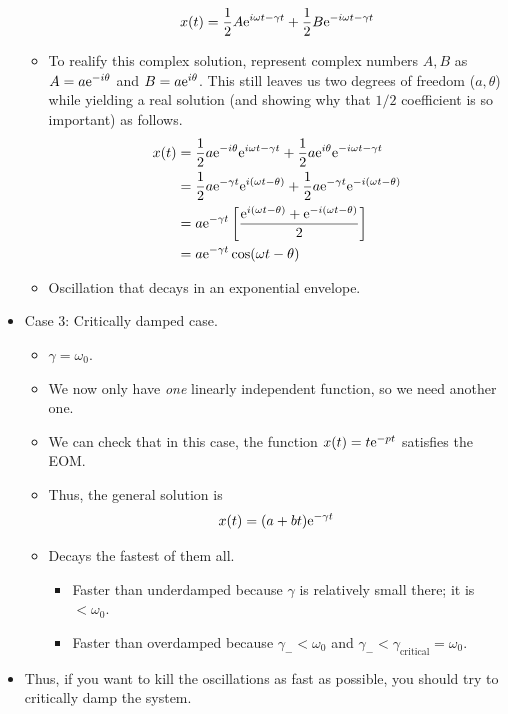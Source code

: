 \documentclass[../notes.tex]{subfiles}
\begin{document}
\begin{itemize}
\begin{itemize}
\begin{equation*}
            x(t) = \frac{1}{2}A\e[i\omega t-\gamma t]+\frac{1}{2}B\e[-i\omega t-\gamma t]
        \end{equation*}
        \item To realify this complex solution, represent complex numbers $A,B$ as $A=a\e[-i\theta]$ and $B=a\e[i\theta]$. This still leaves us two degrees of freedom ($a,\theta$) while yielding a real solution (and showing why that $1/2$ coefficient is so important) as follows.
        \begin{align*}
            x(t) &= \frac{1}{2}a\e[-i\theta]\e[i\omega t-\gamma t]+\frac{1}{2}a\e[i\theta]\e[-i\omega t-\gamma t]\\
            &= \frac{1}{2}a\e[-\gamma t]\e[i(\omega t-\theta)]+\frac{1}{2}a\e[-\gamma t]\e[-i(\omega t-\theta)]\\
            &= a\e[-\gamma t]\left[ \frac{\e[i(\omega t-\theta)]+\e[-i(\omega t-\theta)]}{2} \right]\\
            &= a\e[-\gamma t]\cos(\omega t-\theta)
        \end{align*}
        \item Oscillation that decays in an exponential envelope.
    \end{itemize}
    \item Case 3: Critically damped case.
    \begin{itemize}
        \item $\gamma=\omega_0$.
        \item We now only have \emph{one} linearly independent function, so we need another one.
        \item We can check that in this case, the function $x(t)=t\e[-pt]$ satisfies the EOM.
        \item Thus, the general solution is
        \begin{equation*}
            x(t) = (a+bt)\e[-\gamma t]
        \end{equation*}
        \item Decays the fastest of them all.
        \begin{itemize}
            \item Faster than underdamped because $\gamma$ is relatively small there; it is $<\omega_0$.
            \item Faster than overdamped because $\gamma_-<\omega_0$ and $\gamma_-<\gamma_\text{critical}=\omega_0$.
        \end{itemize}
    \end{itemize}
    \item Thus, if you want to kill the oscillations as fast as possible, you should try to critically damp the system.

\end{itemize}
\end{document}

